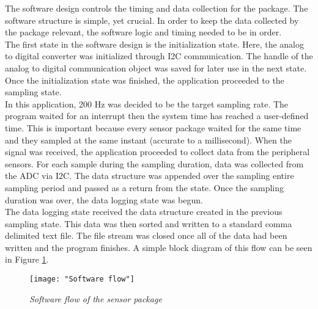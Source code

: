 The software design controls the timing and data collection for the
package. The software structure is simple, yet crucial. In order to
keep the data collected by the package relevant, the software
logic and timing needed to be in order. \\

The first state in the software design is the initialization state.
Here, the analog to digital converter was initialized through I2C
communication. The handle of the analog to digital communication
object was saved for later use in the next state. Once the
initialization state was finished, the application proceeded
to the sampling state.\\

In this application, 200 Hz was decided to be the target sampling
rate. The program waited for an interrupt then the system time 
has reached a user-defined time. This is important because every 
sensor package waited for the same time and they sampled  
at the same instant (accurate to a millisecond). When the signal was received, 
the application proceeded to collect data from the peripheral sensors. For
each sample during the sampling duration, data was collected
from the ADC via I2C. The data structure was appended over the sampling entire
sampling period and passed as a return from the state.
Once the sampling duration was over, the data logging
state was begun. \\

The data logging state received the data structure created in the
previous sampling state. This data was then sorted and written to a
standard comma delimited text file. The file stream was closed
once all of the data had been written and the program finishes. A
simple block diagram of this flow can be seen in Figure
\ref{fig:PRO_SoftFlow}.

\begin{figure}[H]
\centering
\texttt{[image: "Software flow"]}
\caption{\textit{Software flow of the sensor package}}
\label{fig:PRO_SoftFlow}
\end{figure}
